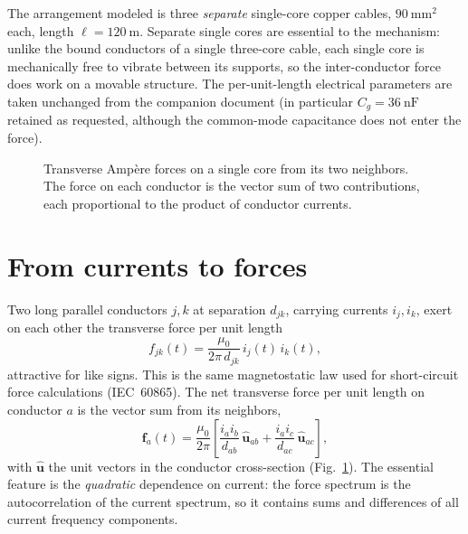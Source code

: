 \documentclass[11pt,a4paper]{article}
\begin{document}
The arrangement modeled is three \emph{separate} single-core copper cables,
$90\ \mathrm{mm^2}$ each, length $\ell=120\ \mathrm{m}$. Separate single cores are
essential to the mechanism: unlike the bound conductors of a single three-core
cable, each single core is mechanically free to vibrate between its supports, so
the inter-conductor force does work on a movable structure. The per-unit-length
electrical parameters are taken unchanged from the companion document
(in particular $C_g=36\ \mathrm{nF}$ retained as requested, although the
common-mode capacitance does not enter the force).

\begin{figure}[h]
\centering
{}
\caption{Transverse Amp\`ere forces on a single core from its two neighbors. The
force on each conductor is the vector sum of two contributions, each proportional
to the product of conductor currents.}
\label{fig:forces}
\end{figure}

\section{From currents to forces}
Two long parallel conductors $j,k$ at separation $d_{jk}$, carrying currents
$i_j,i_k$, exert on each other the transverse force per unit length
\begin{equation}
f_{jk}(t)=\frac{\mu_0}{2\pi\,d_{jk}}\,i_j(t)\,i_k(t),
\label{eq:ampere}
\end{equation}
attractive for like signs. This is the same magnetostatic law used for
short-circuit force calculations (IEC~60865). The net transverse force per unit
length on conductor $a$ is the vector sum from its neighbors,
\begin{equation}
\bm{f}_a(t)=\frac{\mu_0}{2\pi}\left[
\frac{i_a i_b}{d_{ab}}\,\hat{\bm{u}}_{ab}
+\frac{i_a i_c}{d_{ac}}\,\hat{\bm{u}}_{ac}\right],
\label{eq:fnet}
\end{equation}
with $\hat{\bm{u}}$ the unit vectors in the conductor cross-section
(Fig.~\ref{fig:forces}). The essential feature is the \emph{quadratic} dependence
on current: the force spectrum is the autocorrelation of the current spectrum, so
it contains sums and differences of all current frequency components.
\end{document}
